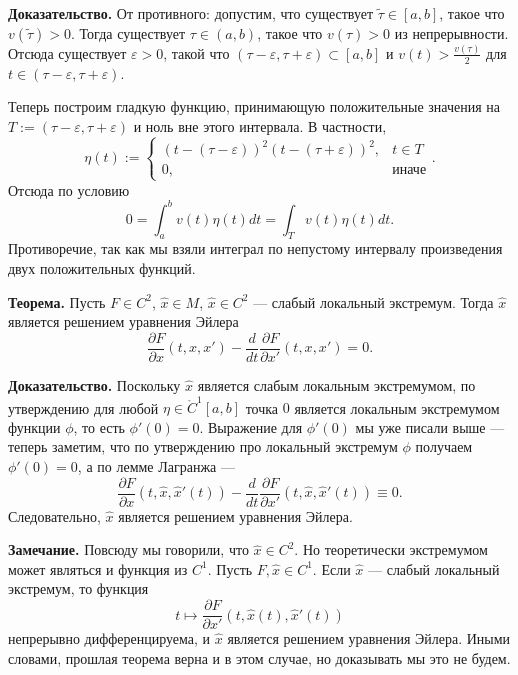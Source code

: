 \textbf{Доказательство.} От противного: допустим, что существует $\tilde \tau \in [a, b]$, такое что $v(\tilde \tau) > 0$.
Тогда существует $\tau \in (a, b)$, такое что $v(\tau) > 0$ из непрерывности.
Отсюда существует $\varepsilon > 0$, такой что $(\tau - \varepsilon, \tau + \varepsilon) \subset [a, b]$ и $v(t) > \frac{v(\tau)}{2}$ для $t \in (\tau - \varepsilon, \tau + \varepsilon)$.

Теперь построим гладкую функцию, принимающую положительные значения на $T := (\tau - \varepsilon, \tau + \varepsilon)$ и ноль вне этого интервала.
В частности,
\[
    \eta(t) :=
    \begin{cases}
        (t - (\tau - \varepsilon))^2 (t - (\tau + \varepsilon))^2, & t \in T \\
        0, & \text{иначе}
    \end{cases}.
\]
Отсюда по условию
\[
    0 = \int_a^b v(t) \eta(t) dt = \int_T v(t) \eta(t) dt.
\]
Противоречие, так как мы взяли интеграл по непустому интервалу произведения двух положительных функций.

\QED

\textbf{Теорема.} Пусть $F \in C^2$, $\widehat x \in M$, $\widehat x \in C^2$ --- слабый локальный экстремум.
Тогда $\widehat x$ является решением уравнения Эйлера
\[
    \frac{\partial F}{\partial x} (t, x, x') - \frac{d}{dt} \frac{\partial F}{\partial x'} (t, x, x') = 0.
\]

\textbf{Доказательство.} Поскольку $\widehat x$ является слабым локальным экстремумом, по утверждению для любой $\eta \in \mathring C^1[a, b]$ точка $0$ является локальным экстремумом функции $\phi$, то есть $\phi'(0) = 0$.
Выражение для $\phi'(0)$ мы уже писали выше --- теперь заметим, что по утверждению про локальный экстремум $\phi$ получаем $\phi'(0) = 0$, а по лемме Лагранжа ---
\[
    \frac{\partial F}{\partial x} (t, \widehat x, \widehat x'(t)) - \frac{d}{dt} \frac{\partial F}{\partial x'} (t, \widehat x, \widehat x'(t)) \equiv 0.
\]
Следовательно, $\widehat x$ является решением уравнения Эйлера.

\QED

\textbf{Замечание.} Повсюду мы говорили, что $\widehat x \in C^2$.
Но теоретически экстремумом может являться и функция из $C^1$.
Пусть $F, \widehat x \in C^1$.
Если $\widehat x$ --- слабый локальный экстремум, то функция
\[
    t \mapsto \frac{\partial F}{\partial x'} (t, \widehat x(t), \widehat x'(t))
\]
непрерывно дифференцируема, и $\widehat x$ является решением уравнения Эйлера.
Иными словами, прошлая теорема верна и в этом случае, но доказывать мы это не будем.

